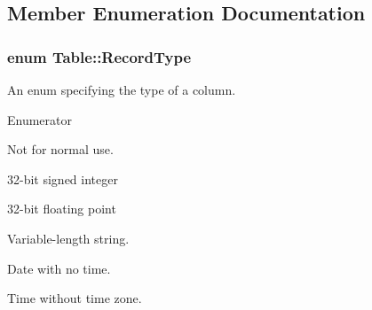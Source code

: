 \subsection{Member Enumeration Documentation}
\hypertarget{class_table_af8f9ec96ecaa35a2e65312b74ddfeae6}{
\subsubsection[{Record\-Type}]{\setlength{\rightskip}{0pt plus 5cm}enum {\bf Table\-::\-Record\-Type}}}\label{class_table_af8f9ec96ecaa35a2e65312b74ddfeae6}
An enum specifying the type of a column. \begin{Desc}
\item[Enumerator]\par
\begin{description}
\item[{\em 
\hypertarget{class_table_af8f9ec96ecaa35a2e65312b74ddfeae6a0e9b8fc48315b1aa6736b0a6d1a5dd5c}{undefined\-\_\-type}\label{class_table_af8f9ec96ecaa35a2e65312b74ddfeae6a0e9b8fc48315b1aa6736b0a6d1a5dd5c}
}]Not for normal use. \item[{\em 
\hypertarget{class_table_af8f9ec96ecaa35a2e65312b74ddfeae6a0739dd940ab69c758e43e1fd594f8500}{integer}\label{class_table_af8f9ec96ecaa35a2e65312b74ddfeae6a0739dd940ab69c758e43e1fd594f8500}
}]32-\/bit signed integer \item[{\em 
\hypertarget{class_table_af8f9ec96ecaa35a2e65312b74ddfeae6adb56749fe0fd26f3af064ab8b1b695b7}{floating}\label{class_table_af8f9ec96ecaa35a2e65312b74ddfeae6adb56749fe0fd26f3af064ab8b1b695b7}
}]32-\/bit floating point \item[{\em 
\hypertarget{class_table_af8f9ec96ecaa35a2e65312b74ddfeae6aa112e11f34f9be73cb2be2b88f193ddb}{varchar}\label{class_table_af8f9ec96ecaa35a2e65312b74ddfeae6aa112e11f34f9be73cb2be2b88f193ddb}
}]Variable-\/length string. \item[{\em 
\hypertarget{class_table_af8f9ec96ecaa35a2e65312b74ddfeae6a31f82673442a5b478c44239c404d921c}{date}\label{class_table_af8f9ec96ecaa35a2e65312b74ddfeae6a31f82673442a5b478c44239c404d921c}
}]Date with no time. \item[{\em 
\hypertarget{class_table_af8f9ec96ecaa35a2e65312b74ddfeae6ab7605a19d0f66b3e1d92a8270bdbf34b}{time}\label{class_table_af8f9ec96ecaa35a2e65312b74ddfeae6ab7605a19d0f66b3e1d92a8270bdbf34b}
}]Time without time zone. \end{description}
\end{Desc}


